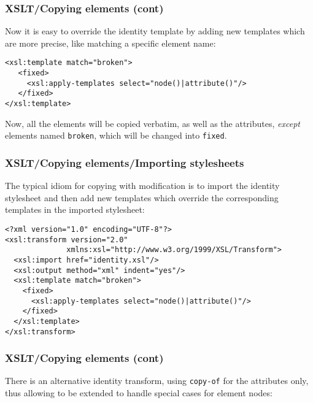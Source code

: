 %
\begin{frame}[containsverbatim]
\frametitle{XSLT/Copying elements (cont)}

Now it is easy to override the identity template by adding new
templates which are more precise, like matching a specific element
name:
{\small
\begin{verbatim}
<xsl:template match="broken">
   <fixed>
     <xsl:apply-templates select="node()|attribute()"/>
   </fixed>
</xsl:template>
\end{verbatim}
}
Now, all the elements will be copied verbatim, as well as the
attributes, \emph{except} elements named \texttt{broken}, which will
be changed into \texttt{fixed}.

\end{frame}

%
\begin{frame}[containsverbatim]
\frametitle{XSLT/Copying elements/Importing stylesheets}

The typical idiom for copying with modification is to import the
identity stylesheet and then add new templates which override the
corresponding templates in the imported stylesheet:
{\small
\begin{verbatim}
<?xml version="1.0" encoding="UTF-8"?>
<xsl:transform version="2.0" 
              xmlns:xsl="http://www.w3.org/1999/XSL/Transform">
  <xsl:import href="identity.xsl"/>
  <xsl:output method="xml" indent="yes"/>
  <xsl:template match="broken">
    <fixed>
      <xsl:apply-templates select="node()|attribute()"/>
    </fixed>
  </xsl:template>
</xsl:transform>
\end{verbatim}
}

\end{frame}

%
\begin{frame} 
\frametitle{XSLT/Copying elements (cont)}

There is an alternative identity transform, using \texttt{copy-of} for
the attributes only, thus allowing to be extended to handle special
cases for element nodes: 

\end{frame}

